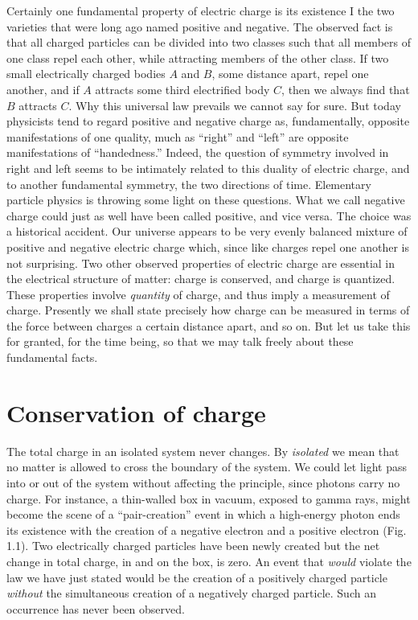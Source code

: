 Certainly one fundamental property of electric charge is its
existence I the two varieties that were long ago named positive and negative.
The observed fact is that all charged particles can be divided into two classes
such that all members of one class repel each other, while attracting members
of the other class. If two small electrically charged bodies $A$ and
$B$, some distance apart, repel one another, and if $A$ attracts some
third electrified body $C$, then we always find that $B$ attracts
$C$. Why this universal law prevails we cannot say for sure. But today
physicists tend to regard positive and negative charge as, fundamentally,
opposite manifestations of one quality, much as ``right'' and ``left'' are
opposite manifestations of ``handedness.'' Indeed, the question of symmetry
involved in right and left seems to be intimately related to this duality of
electric charge, and to another fundamental symmetry, the two directions of
time. Elementary particle physics is throwing some light on these questions.
What we call negative charge could just as well have been
called positive, and vice versa. The choice was a historical accident. Our
universe appears to be very evenly balanced mixture of positive and negative
electric charge which, since like charges repel one another is not surprising. 
Two other observed properties of electric charge are
essential in the electrical structure of matter: charge is conserved, and
charge is quantized. These properties involve \emph{quantity} of charge, and
thus imply a measurement of charge. Presently we shall state precisely how
charge can be measured in terms of the force between charges a certain distance
apart, and so on. But let us take this for granted, for the time being, so that
we may talk freely about these fundamental facts. 

\section{Conservation of charge}

The total charge in an isolated system never changes. By
\emph{isolated} we mean that no matter is allowed to cross the boundary of the
system. We could let light pass into or out of the system without affecting the
principle, since photons carry no charge. For instance, a thin-walled box in
vacuum, exposed to gamma rays, might become the scene of a ``pair-creation''
event in which a high-energy photon ends its existence with the creation of a
negative electron and a positive electron (Fig. 1.1). Two electrically charged
particles have been newly created but the net change in total charge, in and on
the box, is zero. An event that \emph{would} violate the law we have just
stated would be the creation of a positively charged particle \emph{without}
the simultaneous creation of a negatively charged particle. Such an occurrence
has never been observed. 

